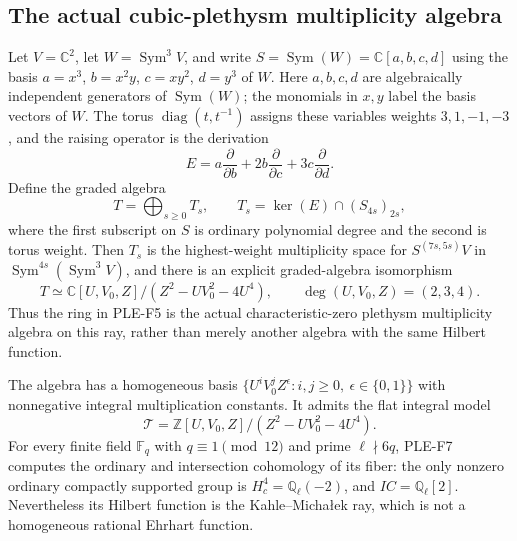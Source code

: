 \subsection{The actual cubic-plethysm multiplicity algebra}

\begin{proposition}
\label{prop:actualplethysmalgebra}
Let $V=\mathbb C^2$, let $W=\operatorname{Sym}^3V$, and write
$S=\operatorname{Sym}(W)=\mathbb C[a,b,c,d]$ using the basis
$a=x^3$, $b=x^2y$, $c=xy^2$, $d=y^3$ of $W$.
Here $a,b,c,d$ are algebraically independent generators of
$\operatorname{Sym}(W)$; the monomials in $x,y$ label the basis
vectors of $W$.
The torus $\operatorname{diag}(t,t^{-1})$ assigns these variables
weights $3,1,-1,-3$, and the raising operator is the derivation
\[
 E=a\frac{\partial}{\partial b}
      +2b\frac{\partial}{\partial c}
      +3c\frac{\partial}{\partial d}.
\]
Define the graded algebra
\[
 T=\bigoplus_{s\ge0}T_s,\qquad
 T_s=\ker(E)\cap(S_{4s})_{2s},
 \tag{PLE-F8a}
\]
where the first subscript on $S$ is ordinary polynomial degree and
the second is torus weight. Then $T_s$ is the highest-weight
multiplicity space for
$S^{(7s,5s)}V$ in $\operatorname{Sym}^{4s}(\operatorname{Sym}^3V)$,
and there is an explicit graded-algebra isomorphism
\[
 T\simeq
 \mathbb C[U,V_0,Z]/(Z^2-UV_0^2-4U^4),
 \qquad \deg(U,V_0,Z)=(2,3,4).
 \tag{PLE-F8b}
\]
Thus the ring in PLE-F5 is the actual characteristic-zero plethysm
multiplicity algebra on this ray, rather than merely another algebra
with the same Hilbert function.

The algebra has a homogeneous basis
$\{U^iV_0^jZ^\epsilon:i,j\ge0,\ \epsilon\in\{0,1\}\}$
with nonnegative integral multiplication constants. It admits the
flat integral model
\[
 \mathcal T=\mathbb Z[U,V_0,Z]/(Z^2-UV_0^2-4U^4).
 \tag{PLE-F8c}
\]
For every finite field $\mathbb F_q$ with $q\equiv1\pmod{12}$
and prime $\ell\nmid6q$, PLE-F7 computes the ordinary and
intersection cohomology of its fiber: the only nonzero ordinary
compactly supported group is $H_c^4=\mathbb Q_\ell(-2)$, and
$IC=\mathbb Q_\ell[2]$. Nevertheless its Hilbert function is the
Kahle--Micha\l ek ray, which is not a homogeneous rational Ehrhart
function.
\end{proposition}

